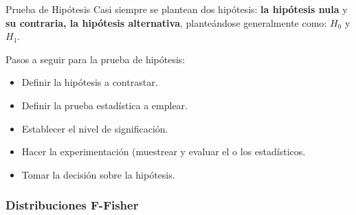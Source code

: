 \documentclass[11pt]{beamer}
\begin{document}
       \begin{frame}{Prueba de Hipótesis}
         Casi siempre se plantean dos hipótesis: \textbf{la hipótesis nula} y \textbf{su contraria, la hipótesis alternativa}, planteándose generalmente como: $H_0$ y $H_1$.


         Pasos a seguir para la prueba de hipótesis:
         \begin{itemize}
            \item Definir la hipótesis a contrastar.
            \item Definir la prueba estadística a emplear.
            \item Establecer el nivel de significación.
            \item Hacer la experimentación (muestrear y evaluar el o los estadísticos.
            \item Tomar la decisión sobre la hipótesis.
         \end{itemize}
       \end{frame}

       \subsubsection*{Distribuciones F-Fisher}
\end{document}
